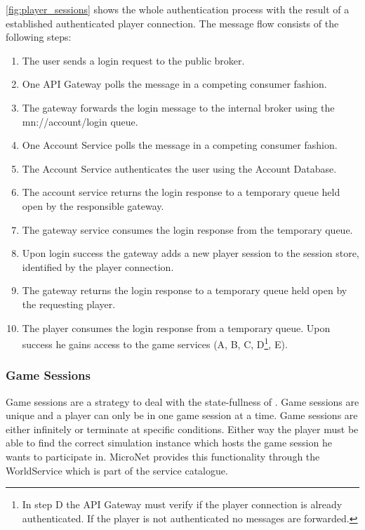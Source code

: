 \autoref{fig:player_sessions} shows the whole authentication process with the
result of a established authenticated player connection. The message flow
consists of the following steps:

\begin{enumerate}
  \item The user sends a login request to the public broker.
  \item One API Gateway polls the message in a competing consumer fashion.
  \item The gateway forwards the login message to the internal broker using the
  mn://account/login queue.
  \item One Account Service polls the message in a competing consumer fashion.
  \item The Account Service authenticates the user using the Account Database.
  \item The account service returns the login response to a temporary queue held
  open by the responsible gateway.
  \item The gateway service consumes the login response from the temporary
  queue.
  \item Upon login success the gateway adds a new player session to the session
  store, identified by the player connection.
  \item The gateway returns the login response to a temporary queue held open by
  the requesting player.
  \item The player consumes the login response from a temporary queue. Upon
  success he gains access to the game services (A, B, C, D\footnote{In step D
  the API Gateway must verify if the player connection is already
  authenticated. If the player is not authenticated no messages are forwarded.},
  E).
\end{enumerate}



\subsubsection{Game Sessions}

Game sessions are a strategy to deal with the state-fullness of \ogs{}. Game
sessions are unique and a player can only be in one game session at a time. Game
sessions are either infinitely or terminate at specific conditions. Either way
the player must be able to find the correct simulation instance which hosts the
game session he wants to participate in. MicroNet provides this functionality
through the WorldService which is part of the service catalogue.

